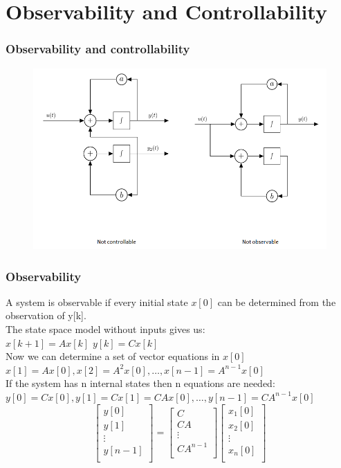 \section{Observability and Controllability}
\begin{frame}
	\frametitle{Observability and controllability}
	\begin{figure}
	\centering
	\includegraphics[width=0.7\linewidth]{Images/discrete_time_systems_34}
\end{figure}
\end{frame}
\begin{frame}
	\frametitle{Observability}
	\small{
	A system is observable if every initial state $x[0]$ can be determined from the observation of y[k].\\
	The state space model without inputs gives us:\\
	$x[k+1] = A x[k] $ \quad \quad				$y[k]=Cx[k]$\\
	Now we can determine a set of vector equations in $x[0]$\\
	$x[1] = A x[0],x[2]  = A^2x[0],\dots , x[n-1] = A^{n-1} x[0]$\\
	If the system has n internal states then n equations are needed:\\
	$y[0] =Cx[0],y[1]=Cx[1]=CAx[0],\dots, y[n-1] = C A^{n-1} x[0]$\\
	\[
	\begin{bmatrix}
		y[0]\\
		y[1]\\
		\vdots \\
		y[n-1]\\
	\end{bmatrix} = 
	\begin{bmatrix}
	C\\
	CA\\
	\vdots\\
	CA^{n-1}\\
	\end{bmatrix} \begin{bmatrix}
	x_1[0]\\
	x_2[0]\\
	\vdots\\
	x_n[0]\\
	\end{bmatrix}
	\]}
\end{frame}
